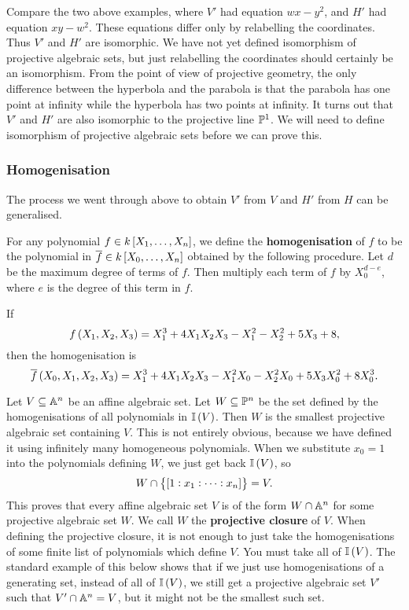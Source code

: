 Compare the two above examples, where $ V' $ had equation $ wx - y^2 $, and $ H' $ had equation $ xy - w^2 $. These equations differ only by relabelling the coordinates. Thus $ V' $ and $ H' $ are isomorphic. We have not yet defined isomorphism of projective algebraic sets, but just relabelling the coordinates should certainly be an isomorphism. From the point of view of projective geometry, the only difference between the hyperbola and the parabola is that the parabola has one point at infinity while the hyperbola has two points at infinity. It turns out that $ V' $ and $ H' $ are also isomorphic to the projective line $ \PP^1 $. We will need to define isomorphism of projective algebraic sets before we can prove this.

\pagebreak

\subsubsection{Homogenisation}

The process we went through above to obtain $ V' $ from $ V $ and $ H' $ from $ H $ can be generalised.

\begin{definition*}
For any polynomial $ f \in k\sbr{X_1, \dots, X_n} $, we define the \textbf{homogenisation} of $ f $ to be the polynomial in $ \overline{f} \in k\sbr{X_0, \dots, X_n} $ obtained by the following procedure. Let $ d $ be the maximum degree of terms of $ f $. Then multiply each term of $ f $ by $ X_0^{d - e} $, where $ e $ is the degree of this term in $ f $.
\end{definition*}

\begin{example*}
If
$$ f\br{X_1, X_2, X_3} = X_1^3 + 4X_1X_2X_3 - X_1^2 - X_2^2 + 5X_3 + 8, $$
then the homogenisation is
$$ \overline{f}\br{X_0, X_1, X_2, X_3} = X_1^3 + 4X_1X_2X_3 - X_1^2X_0 - X_2^2X_0 + 5X_3X_0^2 + 8X_0^3. $$
\end{example*}

Let $ V \subseteq \AA^n $ be an affine algebraic set. Let $ W \subseteq \PP^n $ be the set defined by the homogenisations of all polynomials in $ \II\br{V} $. Then $ W $ is the smallest projective algebraic set containing $ V $. This is not entirely obvious, because we have defined it using infinitely many homogeneous polynomials. When we substitute $ x_0 = 1 $ into the polynomials defining $ W $, we just get back $ \II\br{V} $, so
$$ W \cap \cbr{\sbr{1 : x_1 : \dots : x_n}} = V. $$
This proves that every affine algebraic set $ V $ is of the form $ W \cap \AA^n $ for some projective algebraic set $ W $. We call $ W $ the \textbf{projective closure} of $ V $. When defining the projective closure, it is not enough to just take the homogenisations of some finite list of polynomials which define $ V $. You must take all of $ \II\br{V} $. The standard example of this below shows that if we just use homogenisations of a generating set, instead of all of $ \II\br{V} $, we still get a projective algebraic set $ V' $ such that $ V' \cap \AA^n = V $, but it might not be the smallest such set.

